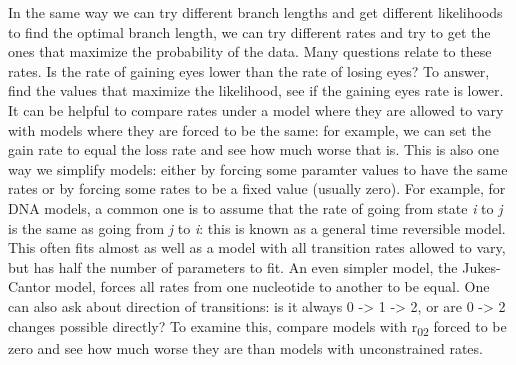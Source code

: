 \documentclass[
]{article}
\begin{document}
In the same way we can try different branch lengths and get different likelihoods to find the optimal branch length, we can try different rates and try to get the ones that maximize the probability of the data. Many questions relate to these rates. Is the rate of gaining eyes lower than the rate of losing eyes? To answer, find the values that maximize the likelihood, see if the gaining eyes rate is lower. It can be helpful to compare rates under a model where they are allowed to vary with models where they are forced to be the same: for example, we can set the gain rate to equal the loss rate and see how much worse that is. This is also one way we simplify models: either by forcing some paramter values to have the same rates or by forcing some rates to be a fixed value (usually zero). For example, for DNA models, a common one is to assume that the rate of going from state \emph{i} to \emph{j} is the same as going from \emph{j} to \emph{i}: this is known as a general time reversible model. This often fits almost as well as a model with all transition rates allowed to vary, but has half the number of parameters to fit. An even simpler model, the Jukes-Cantor model, forces all rates from one nucleotide to another to be equal. One can also ask about direction of transitions: is it always 0 -\textgreater{} 1 -\textgreater{} 2, or are 0 -\textgreater{} 2 changes possible directly? To examine this, compare models with r\textsubscript{02} forced to be zero and see how much worse they are than models with unconstrained rates.
\end{document}
